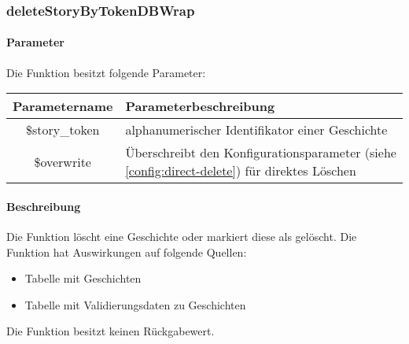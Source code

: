 \subsubsection{deleteStoryByTokenDBWrap}
\paragraph{Parameter} Die Funktion besitzt folgende Parameter:
\begin{table}[H]
	\begin{tabular}{|c|p{11cm}|}
		\hline
		\textbf{Parametername} & \textbf{Parameterbeschreibung} \\ \hline
		\$story\_token & alphanumerischer Identifikator einer Geschichte \\ \hline
		\$overwrite    & Überschreibt den Konfigurationsparameter (siehe \autoref{config:direct-delete}) für direktes Löschen \\ \hline
	\end{tabular}
\end{table}
\paragraph{Beschreibung} Die Funktion löscht eine Geschichte oder markiert diese als gelöscht. Die Funktion hat Auswirkungen auf folgende Quellen:
\begin{itemize}
	\item Tabelle mit Geschichten
	\item Tabelle mit Validierungsdaten zu Geschichten
\end{itemize}
Die Funktion besitzt keinen Rückgabewert.